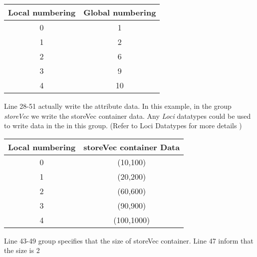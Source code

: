 \begin{center}
\begin{tabular}[h]{|c|c|} \hline
Local numbering & Global numbering \\ \hline
0   &  1         \\
1   &  2         \\
2   &  6         \\
3   &  9         \\
4   &  10        \\ \hline
\end{tabular}
\end{center}

\par Line 28-51 actually write the attribute data. In this example, in
the group {\em storeVec}
we write the storeVec container data. Any {\em Loci} datatypes could
be used to write data in
the in this group. (Refer to Loci Datatypes for more details )

\begin{center}
\begin{tabular}[h]{|c|c|} \hline
Local numbering & storeVec container Data \\ \hline
0   &  (10,100)         \\
1   &  (20,200)         \\
2   &  (60,600)         \\
3   &  (90,900)         \\
4   &  (100,1000)      \\ \hline
\end{tabular}
\end{center}

\par Line 43-49 group specifies that the size of storeVec
container. Line 47 inform that the size is 2

